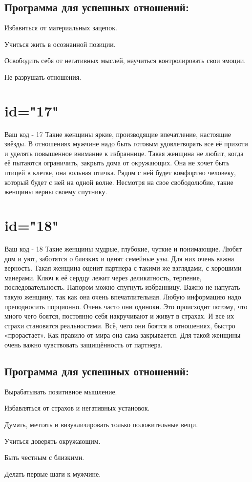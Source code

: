 \subsection{Программа для успешных отношений:}
\item Избавиться от материальных зацепок.
\item Учиться жить в осознанной позиции.
\item Освободить себя от негативных мыслей, научиться контролировать 
свои эмоции.
\item Не разрушать отношения.
\endsubsection
\endsection

\section{id="17"}{Ваш код - 17}
Такие женщины яркие, производящие впечатление, настоящие звёзды. 
В отношениях мужчине надо быть готовым удовлетворять все её прихоти 
и уделять повышенное внимание к избраннице. Такая женщина не любит, 
когда её пытаются ограничить, закрыть дома от окружающих. Она не 
хочет быть птицей в клетке, она вольная птичка. Рядом с ней будет 
комфортно человеку, который будет с ней на одной волне. Несмотря 
на свое свободолюбие, такие женщины верны своему спутнику.
\endsubsection
\endsection

\section{id="18"}{Ваш код - 18}
Такие женщины мудрые, глубокие, чуткие и понимающие. Любят дом и 
уют, заботятся о близких и ценят семейные узы. Для них очень важна 
верность. Такая женщина оценит партнера с такими же взглядами, с 
хорошими манерами. Ключ к её сердцу лежит через деликатность, 
терпение, последовательность. Напором можно спугнуть избранницу. 
Важно не напугать такую женщину, так как она очень впечатлительная. 
Любую информацию надо преподносить порционно. Очень часто они одиноки. 
Это происходит потому, что много чего боятся, постоянно себя накручивают 
и живут в страхах. И все их страхи становятся реальностями. Всё, чего 
они боятся в отношениях, быстро «прорастает». Как правило от мира 
она сама закрывается. Для такой женщины очень важно чувствовать 
защищённость от партнера.
\subsection{Программа для успешных отношений:}
\item Вырабатывать позитивное мышление.
\item Избавляться от страхов и негативных установок.
\item Думать, мечтать и визуализировать только положительные вещи.
\item Учиться доверять окружающим.
\item Быть честным с близкими.
\item Делать первые шаги к мужчине.
\endsubsection
\endsection

